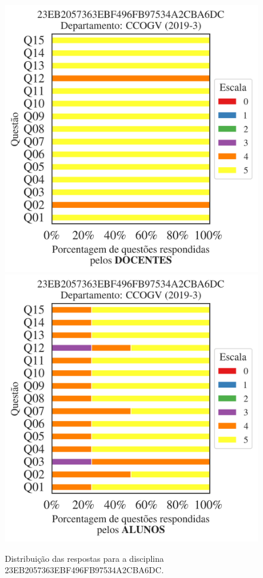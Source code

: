 \documentclass[a4paper,10pt]{article}
\begin{document}
\begin{figure}[h]
\centering
\includegraphics[width=0.485\linewidth]{analise_disciplina_departamento_CCOGV_23EB2057363EBF496FB97534A2CBA6DC_docentes.png}
\includegraphics[width=0.485\linewidth]{analise_disciplina_departamento_CCOGV_23EB2057363EBF496FB97534A2CBA6DC_alunos.png}
\caption{\label{fig:analise_geral_departamento}                Distribuição das respostas para a disciplina 23EB2057363EBF496FB97534A2CBA6DC. }
\end{figure}
\end{document}
